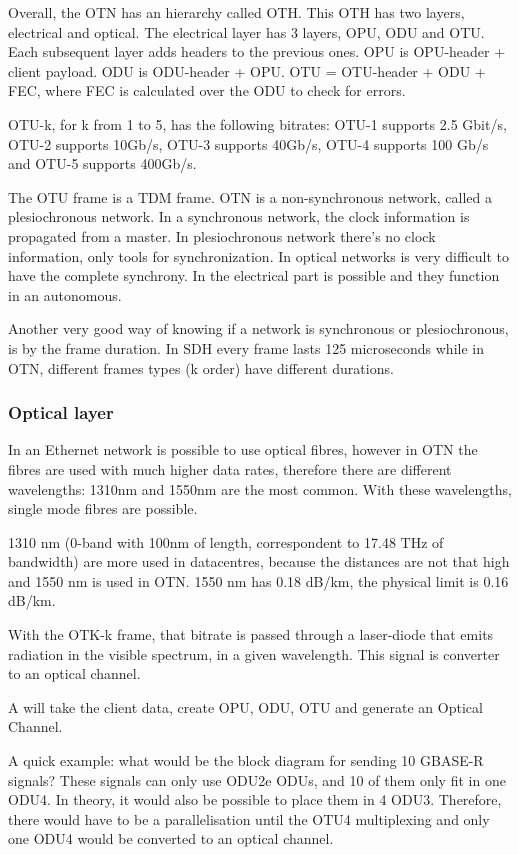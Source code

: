 Overall, the OTN has an hierarchy called OTH. This OTH has two layers, electrical and optical. The electrical layer has 3 layers, OPU, ODU and OTU. Each subsequent layer adds headers to the previous ones. OPU is OPU-header + client payload. ODU is ODU-header + OPU. OTU = OTU-header + ODU + FEC, where FEC is calculated over the ODU to check for errors.

OTU-k, for k from 1 to 5, has the following bitrates: OTU-1 supports 2.5 Gbit/s, OTU-2 supports 10Gb/s, OTU-3 supports 40Gb/s, OTU-4 supports 100 Gb/s and OTU-5 supports 400Gb/s.

The OTU frame is a TDM frame. OTN is a non-synchronous network, called a plesiochronous network. In a synchronous network, the clock information is propagated from a master. In plesiochronous network there's no clock information, only tools for synchronization. In optical networks is very difficult to have the complete synchrony. In the electrical part is possible and they function in an autonomous. 

Another very good way of knowing if a network is synchronous or plesiochronous, is by the frame duration. In SDH every frame lasts 125 microseconds while in OTN, different frames types (k order) have different durations.



\subsubsection{Optical layer}

In an Ethernet network is possible to use optical fibres, however in OTN the fibres are used with much higher data rates, therefore there are different wavelengths:
1310nm and 1550nm are the most common. With these wavelengths, single mode fibres are possible.

1310 nm (0-band with 100nm of length, correspondent to 17.48 THz of bandwidth) are more used in datacentres, because the distances are not that high and 1550 nm is used in OTN. 1550 nm has 0.18 dB/km, the physical limit is 0.16 dB/km.


With the OTK-k frame, that bitrate is passed through a laser-diode that emits radiation in the visible spectrum, in a given wavelength. This signal is converter to an optical channel.

A  will take the client data, create OPU, ODU, OTU and generate an Optical Channel.

A quick example: what would be the block diagram for sending 10 GBASE-R signals? These signals can only use ODU2e ODUs, and 10 of them only fit in one ODU4. In theory, it would also be possible to place them in 4 ODU3.  Therefore, there would have to be a parallelisation until the OTU4 multiplexing and only one ODU4 would be converted to an optical channel.

